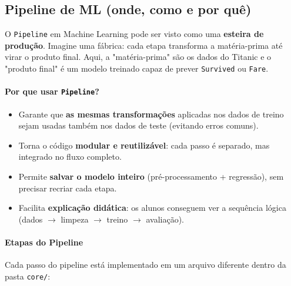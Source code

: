 \documentclass[12pt,a4paper]{article}
\begin{document}
\subsection{Pipeline de ML (onde, como e por quê)}

O \texttt{Pipeline} em Machine Learning pode ser visto como uma \textbf{esteira de produção}.  
Imagine uma fábrica: cada etapa transforma a matéria-prima até virar o produto final.  
Aqui, a "matéria-prima" são os dados do Titanic e o "produto final" é um modelo treinado capaz de prever \texttt{Survived} ou \texttt{Fare}.  

\paragraph{Por que usar \texttt{Pipeline}?}
\begin{itemize}
  \item Garante que \textbf{as mesmas transformações} aplicadas nos dados de treino sejam usadas também nos dados de teste (evitando erros comuns).
  \item Torna o código \textbf{modular e reutilizável}: cada passo é separado, mas integrado no fluxo completo.
  \item Permite \textbf{salvar o modelo inteiro} (pré-processamento + regressão), sem precisar recriar cada etapa.
  \item Facilita \textbf{explicação didática}: os alunos conseguem ver a sequência lógica (dados $\to$ limpeza $\to$ treino $\to$ avaliação).
\end{itemize}

\paragraph{Etapas do Pipeline}
Cada passo do pipeline está implementado em um arquivo diferente dentro da pasta \texttt{core/}:
\end{document}
